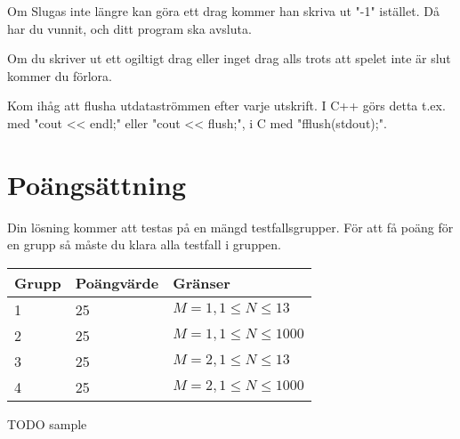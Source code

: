 Om Slugas inte längre kan göra ett drag kommer han skriva ut "-1" istället. Då har du vunnit, och ditt program ska avsluta.

Om du skriver ut ett ogiltigt drag eller inget drag alls trots att spelet inte är slut kommer du förlora.

Kom ihåg att flusha utdataströmmen efter varje utskrift. I C++ görs detta t.ex. med "cout << endl;" eller "cout << flush;", i C med "fflush(stdout);".

\section*{Poängsättning}
Din lösning kommer att testas på en mängd testfallsgrupper. För att få poäng för en grupp så måste du klara alla testfall i gruppen.

\begin{tabular}{| l | l | l |}
\hline
Grupp & Poängvärde & Gränser\\ \hline
1     & 25         & $ M=1, 1 \le N \le 13 $ \\ \hline
2     & 25         & $ M=1, 1 \le N \le 1000 $ \\ \hline
3     & 25         & $ M=2, 1 \le N \le 13 $ \\ \hline
4     & 25         & $ M=2, 1 \le N \le 1000 $ \\ \hline
\end{tabular}

TODO sample
